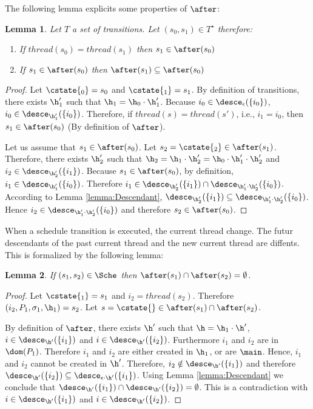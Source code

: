 \documentclass[12pt]{article}
\let\vide\emptyset \let\appartient\in
\let\firstinter\cap
\let\emptyset\vide \let\in\appartient
\let\cap\firstinter
\renewcommand{\subset}{\subseteq}
\newcommand{\thread}{\mathit{thread}}
\newtheorem{lemma}{Lemma}
\begin{document}
The following lemma explicits some properties of \(\after\):
\begin{lemma}\label{lemma:F+}
 Let \(T\) a set of transitions.
 Let \((s_0,s_1)\in T^{\star}\) therefore:
 \begin{enumerate}
  \item If \(\thread(s_0)=\thread(s_1)\) then \(s_1\in\after(s_0)\) 
  \item If \(s_1\in\after(s_0)\) then \(\after(s_1)\subset\after(s_0)\)
 \end{enumerate}
\end{lemma}
\begin{proof}
Let \(\cstate{_0}=s_0\) and \(\cstate{_1}=s_1\). By definition of transitions, there exists \(\h'_1\) such that \(\h_1=\h_0\cdot\h'_1\).
Because \(i_0\in\desce_{\epsilon}(\{i_0\})\),  \(i_0\in\desce_{\h'_1}(\{i_0\})\). Therefore, if \(\thread(s)=\thread(s')\), i.e., \(i_1=i_0\), then \(s_1\in\after(s_0)\) (By definition of \(\after\)).

 Let us assume that \(s_1\in\after(s_0)\).
 Let \(s_2=\cstate{_2}\in\after(s_1)\). Therefore, there exists \(\h'_2\) such that \(\h_2=\h_1\cdot\h'_2=\h_0\cdot\h'_1\cdot\h'_2\) and \(i_2\in\desce_{\h'_2}(\{i_1\})\).
 Because \(s_1\in\after(s_0)\), by definition, \(i_1\in\desce_{\h'_1}(\{i_0\})\). Therefore \(i_1\in\desce_{\h'_2}(\{i_1\})\cap\desce_{\h'_1\cdot\h'_2}(\{i_0\})\). According to Lemma \ref{lemma:Descendant}, \(\desce_{\h'_2}(\{i_1\})\subset\desce_{\h'_1\cdot\h'_2}(\{i_0\})\).
  Hence  \(i_2\in\desce_{\h'_1\cdot\h'_2}(\{i_0\})\) and therefore \(s_2\in\after(s_0)\).
\end{proof}

When a schedule transition is executed, the current thread change. The futur descendants of the past current thread and the new current thread are diffents. This is formalized by the following lemma:

\begin{lemma} \label{lemma:F-}
 If \((s_1,s_2)\in \Sche\) then \(\after(s_1)\cap\after(s_2)=\emptyset\).
\end{lemma}
\begin{proof}
Let \(\cstate{_1}=s_1\) and \(i_2=\thread(s_2)\). Therefore \((i_2,P_1,\m_1,\h_1)=s_2\).
Let \(s=\cstate{}\in \after(s_1)\cap\after(s_2)\).

By definition of \(\after\), there exists \(\h'\) such that \(\h=\h_1\cdot\h'\), \(i\in \desce_{\h'}(\{i_1\})\) and \(i\in \desce_{\h'}(\{i_2\})\).
Furthermore \(i_1\) and \(i_2\) are in \(\dom(P_1)\). Therefore \(i_1\) and \(i_2\) are either created in \(\h_1\), or are \(\main\). Hence, \(i_1\) and \(i_2\) cannot be created in \(\h'\). Therefore, \(i_2\notin\desce_{\h'}(\{i_1\})\) and therefore \(\desce_{\h'}(\{i_2\})\subset\desce_{\epsilon\cdot\h'}(\{i_1\})\). Using Lemma \ref{lemma:Descendant} we conclude that \(\desce_{\h'}(\{i_1\})\cap\desce_{\h'}(\{i_2\}) = \emptyset\).
This is a contradiction with \(i\in \desce_{\h'}(\{i_1\})\) and \(i\in \desce_{\h'}(\{i_2\})\).
\end{proof}
\end{document}
